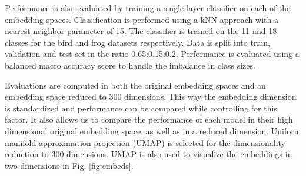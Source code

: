 Performance is also evaluated by training a single-layer classifier on each of the embedding spaces.
Classification is performed using a kNN approach with a nearest neighbor parameter of 15.
The classifier is trained on the 11 and 18 classes for the bird and frog datasets respectively.
Data is split into train, validation and test set in the ratio 0.65:0.15:0.2.
Performance is evaluated using a balanced macro accuracy score \cite{brodersen_balanced_2010} to handle the imbalance in class sizes.

Evaluations are computed in both the original embedding spaces and an embedding space reduced to 300 dimensions.
This way the embedding dimension is standardized and performance can be compared while controlling for this factor.
It also allows us to compare the performance of each model in their high dimensional original embedding space, as well as in a reduced dimension.
Uniform manifold approximation projection (UMAP) \cite{mcinnes_umap_2020} is selected for the dimensionality reduction to 300 dimensions.
UMAP is also used to visualize the embeddings in two dimensions in Fig. \ref{fig:embeds}.